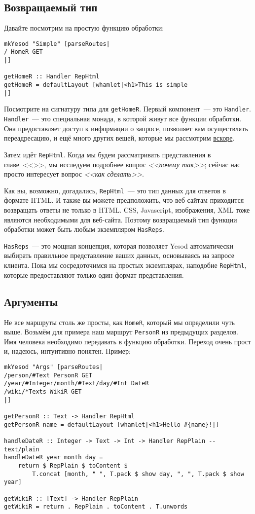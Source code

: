 \subsection{Возвращаемый тип}
Давайте посмотрим на простую функцию обработки:
\begin{lstlisting}
mkYesod "Simple" [parseRoutes|
/ HomeR GET
|]

getHomeR :: Handler RepHtml
getHomeR = defaultLayout [whamlet|<h1>This is simple
|]
\end{lstlisting}

Посмотрите на сигнатуру типа для \lstinline!getHomeR!. Первый
компонент~--- это \lstinline!Handler!. \lstinline!Handler!~--- это
специальная монада, в которой живут все функции обработки. Она
предоставляет доступ к информации о запросе, позволяет вам
осуществлять переадресацию, и ещё много других вещей, которые мы
рассмотрим \hyperref[sec:handler-monad]{вскоре}.

Затем идёт \lstinline!RepHtml!. Когда мы будем рассматривать
представления в главе~<<>>,
мы исследуем подробнее вопрос \emph{<<почему так>>}; сейчас
нас просто интересует вопрос \emph{<<как сделать>>}.

Как вы, возможно, догадались, \lstinline!RepHtml!~--- это тип данных
для ответов в формате HTML. И также вы можете предположить, что веб-сайтам
приходится возвращать ответы не только в HTML. CSS, Javascript,
изображения, XML тоже являются необходимыми для веб-сайта. Поэтому
возвращаемый тип функции обработки может быть любым экземпляром
\lstinline!HasReps!.

\lstinline!HasReps!~--- это мощная концепция, которая позволяет Yesod
автоматически выбирать правильное представление ваших данных,
основываясь на запросе клиента. Пока мы сосредоточимся на простых
экземплярах, наподобие \lstinline!RepHtml!, которые предоставляют
только один формат представления.

\subsection{Аргументы}
Не все маршруты столь же просты, как \lstinline!HomeR!, который мы
определили чуть выше. Возьмём для примера наш маршрут
\lstinline!PersonR! из предыдущих разделов. Имя человека необходимо
передавать в функцию обработки. Переход очень прост и, надеюсь,
интуитивно понятен. Пример:
\begin{lstlisting}
mkYesod "Args" [parseRoutes|
/person/#Text PersonR GET
/year/#Integer/month/#Text/day/#Int DateR
/wiki/*Texts WikiR GET
|]

getPersonR :: Text -> Handler RepHtml
getPersonR name = defaultLayout [whamlet|<h1>Hello #{name}!|]

handleDateR :: Integer -> Text -> Int -> Handler RepPlain -- text/plain
handleDateR year month day =
    return $ RepPlain $ toContent $
        T.concat [month, " ", T.pack $ show day, ", ", T.pack $ show year]

getWikiR :: [Text] -> Handler RepPlain
getWikiR = return . RepPlain . toContent . T.unwords
\end{lstlisting}%

